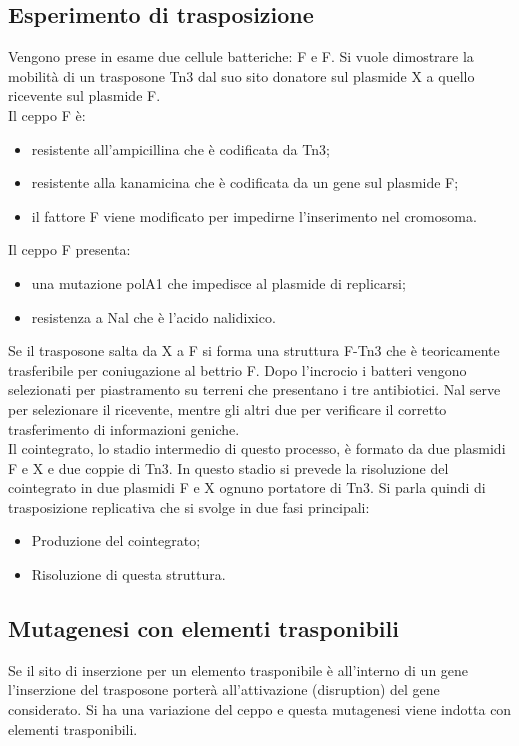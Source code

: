 \subsection{Esperimento di trasposizione}
Vengono prese in esame due cellule batteriche: F\ap{+} e F\ap{-}. Si vuole dimostrare la mobilità di un trasposone Tn3 dal suo sito donatore sul plasmide X a quello ricevente sul plasmide F. 
\\Il ceppo F\ap{+} è:
\begin{itemize}
    \item resistente all'ampicillina che è codificata da Tn3;
    \item resistente alla kanamicina che è codificata da un gene sul plasmide F; 
    \item il fattore F viene modificato per impedirne l'inserimento nel cromosoma.
\end{itemize}
Il ceppo F\ap{-} presenta:
\begin{itemize}
    \item una mutazione polA1 che impedisce al plasmide di replicarsi; 
    \item resistenza a Nal che è l'acido nalidixico.
\end{itemize}
Se il trasposone salta da X a F si forma una struttura F-Tn3 che è teoricamente trasferibile per coniugazione al bettrio F. Dopo l'incrocio i batteri vengono selezionati per piastramento su terreni che presentano i tre antibiotici. Nal serve per selezionare il ricevente, mentre gli altri due per verificare il corretto trasferimento di informazioni geniche. 
\\Il cointegrato, lo stadio intermedio di questo processo, è formato da due plasmidi F e X e due coppie di Tn3. In questo stadio si prevede la risoluzione del cointegrato in due plasmidi F e X ognuno portatore di Tn3. Si parla quindi di trasposizione replicativa che si svolge in due fasi principali:
\begin{itemize}
    \item Produzione del cointegrato; 
    \item Risoluzione di questa struttura.
\end{itemize}
\subsection{Mutagenesi con elementi trasponibili}
Se il sito di inserzione per un elemento trasponibile è all'interno di un gene l'inserzione del trasposone porterà all'attivazione (disruption) del gene considerato. Si ha una variazione del ceppo e questa mutagenesi viene indotta con elementi trasponibili. 
